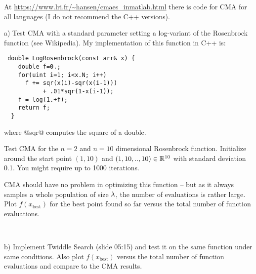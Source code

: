 

\renewcommand{\course}{Optimization}
\renewcommand{\coursepicture}{optim}
\renewcommand{\coursedate}{Summer 2015}
\renewcommand{\exnum}{7}

\exercises
{}
\exercisestitle



At \url{https://www.lri.fr/~hansen/cmaes_inmatlab.html} there is code
for CMA for all languages (I do not recommend the C++ versions).

a) Test CMA with a standard parameter setting a log-variant of the Rosenbrock
  function (see Wikipedia). My implementation of this function in C++ is:\\
\begin{code}
\begin{verbatim}
 double LogRosenbrock(const arr& x) {
    double f=0.;
    for(uint i=1; i<x.N; i++)
      f += sqr(x(i)-sqr(x(i-1)))
           + .01*sqr(1-x(i-1));
    f = log(1.+f);
    return f;
  }
\end{verbatim}
\end{code}
where @sqr@ computes the square of a double.

Test CMA for the $n=2$ and $n=10$ dimensional Rosenbrock
function. Initialize around the start point $(1,10)$ and $(1,10,..,10)\in{\mathbb{R}}^{10}$
with standard deviation 0.1. You might require up to 1000 iterations.

CMA should have no problem in optimizing this function -- but as it
always samples a whole population of size $\lambda$, the number of
evaluations is rather large. Plot $f(x_{\text{best}})$ for the best
point found so far versus the total number of function evaluations.

~

b) Implement Twiddle Search (slide 05:15) and test it on the same
function under same conditions. Also plot $f(x_{\text{best}})$ versus
the total number of function evaluations and compare to the CMA results.



\exerfoot
